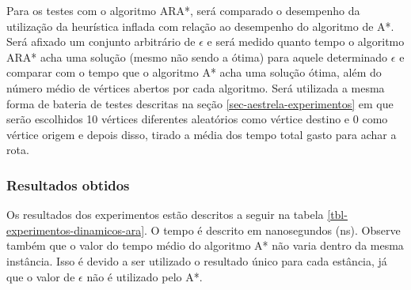 Para os testes com o algoritmo ARA*, será comparado o desempenho da utilização da heurística inflada com relação ao desempenho do algoritmo de A*. Será afixado um conjunto arbitrário de $\epsilon$ e será medido quanto tempo o algoritmo ARA* acha uma solução (mesmo não sendo a ótima) para aquele determinado $\epsilon$ e comparar com o tempo que o algoritmo A* acha uma solução ótima, além do número médio de vértices abertos por cada algoritmo. Será utilizada a mesma forma de bateria de testes descritas na seção \ref{sec-aestrela-experimentos} em que serão escolhidos 10 vértices diferentes aleatórios como vértice destino e 0 como vértice origem e depois disso, tirado a média dos tempo total gasto para achar a rota.

\subsubsection{Resultados obtidos}
\label{sec-experimentos-dinamicos-ara-resultados}

Os resultados dos experimentos estão descritos a seguir na tabela \ref{tbl-experimentos-dinamicos-ara}. O tempo é descrito em nanosegundos (ns). Observe também que o valor do tempo médio do algoritmo A* não varia dentro da mesma instância. Isso é devido a ser utilizado o resultado único para cada estância, já que o valor de $\epsilon$ não é utilizado pelo A*.


